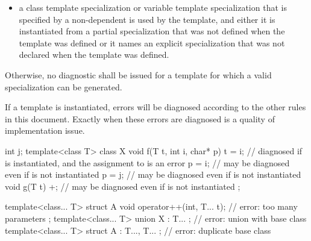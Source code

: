 \begin{itemize}
\begin{note}
\begin{itemize}
\item a class template specialization or variable template specialization that
is specified by a non-dependent  is used by
the template, and either it is instantiated from a partial specialization that
was not defined when the template was defined or it names an explicit
specialization that was not declared when the template was defined.
\end{itemize}
\end{note}
\end{itemize}

Otherwise, no diagnostic shall be issued for a template
for which a valid specialization can be generated.
\begin{note}
If a template is instantiated, errors will be diagnosed according
to the other rules in this document.
Exactly when these errors are diagnosed is a quality of implementation issue.
\end{note}
\begin{example}

\begin{codeblock}
int j;
template<class T> class X {
  void f(T t, int i, char* p) {
    t = i;          // diagnosed if  is instantiated, and the assignment to  is an error
    p = i;          // may be diagnosed even if  is not instantiated
    p = j;          // may be diagnosed even if  is not instantiated
  }
  void g(T t) {
    +;              // may be diagnosed even if  is not instantiated
  }
};

template<class... T> struct A {
  void operator++(int, T... t);                     // error: too many parameters
};
template<class... T> union X : T... { };            // error: union with base class
template<class... T> struct A : T...,  T... { };    // error: duplicate base class
\end{codeblock}
\end{example}

